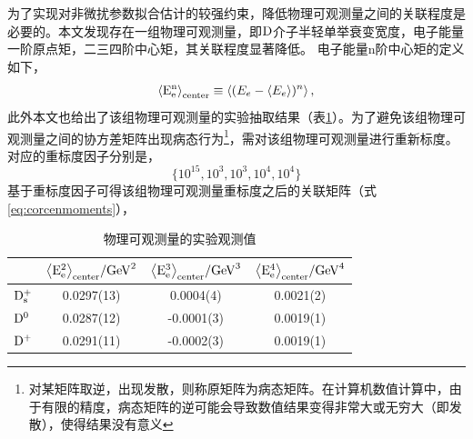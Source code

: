            为了实现对非微扰参数拟合估计的较强约束，降低物理可观测量之间的关联程度是必要的。本文发现存在一组物理可观测量，即$\mathrm{D}$介子半轻单举衰变宽度，电子能量一阶原点矩，二三四阶中心矩，其关联程度显著降低。
               电子能量n阶中心矩的定义如下，
                \begin{align}
                    \left\langle \mathrm{E_e^n}\right\rangle_{\rm center}\equiv \left\langle (E_e - \langle E_e\rangle)^n \right\rangle,
                    \end{align}
            此外本文也给出了该组物理可观测量的实验抽取结果（表\ref{tab:centermomentRest}）。为了避免该组物理可观测量之间的协方差矩阵出现病态行为\footnote{对某矩阵取逆，出现发散，则称原矩阵为病态矩阵。在计算机数值计算中，由于有限的精度，病态矩阵的逆可能会导致数值结果变得非常大或无穷大（即发散），使得结果没有意义}，需对该组物理可观测量进行重新标度。对应的重标度因子分别是，
            \begin{equation}
                \{10^{15}, 10^3, 10^3, 10^4,10^4\}
                \label{eq:rescaleonTOS}
            \end{equation}
            基于重标度因子可得该组物理可观测量重标度之后的关联矩阵（式\eqref{eq:corcenmoments}），
            \begin{table}[htbp]
                \centering
                \begin{tabular}{lccc}
                    \toprule
                     & \( \mathrm{\left\langle E_e^2 \right\rangle_{\text{center}}}/\mathrm{GeV}^2\)  & \(\mathrm{ \left\langle E_e^3 \right\rangle_{\text{center}}}/\mathrm{GeV}^3 \) & \(\mathrm{ \left\langle E_e^4 \right\rangle_{\text{center}}}/\mathrm{GeV}^4 \)  \\
                    \midrule
                    \(\mathrm{ D_s^+} \) & 0.0297(13) & 0.0004(4) & 0.0021(2) \\
                    \( \mathrm{D^0} \) & 0.0287(12) & -0.0001(3) & 0.0019(1) \\
                    \(\mathrm{D^+} \) & 0.0291(11) & -0.0002(3) & 0.0019(1) \\
                    \bottomrule
                \end{tabular}
                \caption{物理可观测量的实验观测值}
                \label{tab:centermomentRest}
            \end{table}
